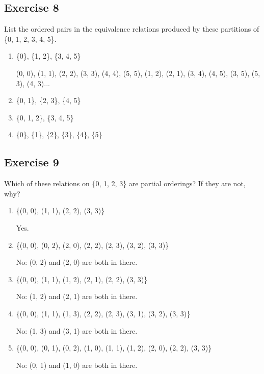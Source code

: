 \documentclass{article}
\newcommand\ssc[2][\DefaultOpt]{%
  \def\DefaultOpt{#2}%
  \subsection[#1]{#2}%
}
\newcommand{\balist}{\begin{enumerate}[label=\alph*.]}
\newcommand{\elist}{\end{enumerate}}
\newcommand{\bk}[1]{\{#1\}}
\begin{document}
\ssc{Exercise 8}{
List the ordered pairs in the equivalence relations produced by these partitions of \bk{0, 1, 2, 3, 4, 5}.

\balist
\item \bk{0}, \bk{1, 2}, \bk{3, 4, 5}

(0, 0), (1, 1), (2, 2), (3, 3), (4, 4), (5, 5), (1, 2), (2, 1), (3, 4), (4, 5), (3, 5), (5, 3), (4, 3)...

\item \bk{0, 1}, \bk{2, 3}, \bk{4, 5}
\item \bk{0, 1, 2}, \bk{3, 4, 5}
\item \bk{0}, \bk{1}, \bk{2}, \bk{3}, \bk{4}, \bk{5}
\elist
}

\ssc{Exercise 9}{

Which of these relations on \bk{0, 1, 2, 3} are partial orderings? If they are not, why?

\balist 
\item \bk{(0, 0), (1, 1), (2, 2), (3, 3)}

Yes.

\item \bk{(0, 0), (0, 2), (2, 0), (2, 2), (2, 3), (3, 2), (3, 3)}

No: (0, 2) and (2, 0) are both in there.

\item \bk{(0, 0), (1, 1), (1, 2), (2, 1), (2, 2), (3, 3)}

No: (1, 2) and (2, 1) are both in there.

\item \bk{(0, 0), (1, 1), (1, 3), (2, 2), (2, 3), (3, 1), (3, 2), (3, 3)}

No: (1, 3) and (3, 1) are both in there.

\item \bk{(0, 0), (0, 1), (0, 2), (1, 0), (1, 1), (1, 2), (2, 0), (2, 2), (3, 3)}

No: (0, 1) and (1, 0) are both in there.

\elist 
}
\end{document}
